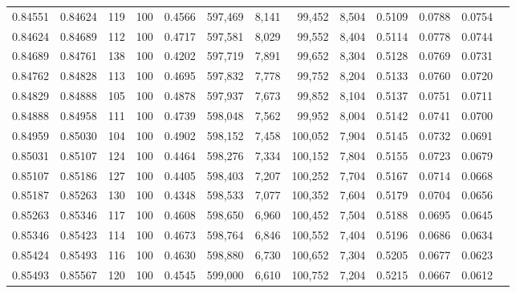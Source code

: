 \begin{tabular}{rrrrrrrrrrrrr}
0.84551 & 0.84624 &   119 & 100 &                                     0.4566 & 597,469 &   8,141 &  99,452 &   8,504 & 0.5109 & 0.0788 & 0.0754 \\
0.84624 & 0.84689 &   112 & 100 &                                     0.4717 & 597,581 &   8,029 &  99,552 &   8,404 & 0.5114 & 0.0778 & 0.0744 \\
0.84689 & 0.84761 &   138 & 100 &                                     0.4202 & 597,719 &   7,891 &  99,652 &   8,304 & 0.5128 & 0.0769 & 0.0731 \\
0.84762 & 0.84828 &   113 & 100 &                                     0.4695 & 597,832 &   7,778 &  99,752 &   8,204 & 0.5133 & 0.0760 & 0.0720 \\
0.84829 & 0.84888 &   105 & 100 &                                     0.4878 & 597,937 &   7,673 &  99,852 &   8,104 & 0.5137 & 0.0751 & 0.0711 \\
0.84888 & 0.84958 &   111 & 100 &                                     0.4739 & 598,048 &   7,562 &  99,952 &   8,004 & 0.5142 & 0.0741 & 0.0700 \\
0.84959 & 0.85030 &   104 & 100 &                                     0.4902 & 598,152 &   7,458 & 100,052 &   7,904 & 0.5145 & 0.0732 & 0.0691 \\
0.85031 & 0.85107 &   124 & 100 &                                     0.4464 & 598,276 &   7,334 & 100,152 &   7,804 & 0.5155 & 0.0723 & 0.0679 \\
0.85107 & 0.85186 &   127 & 100 &                                     0.4405 & 598,403 &   7,207 & 100,252 &   7,704 & 0.5167 & 0.0714 & 0.0668 \\
0.85187 & 0.85263 &   130 & 100 &                                     0.4348 & 598,533 &   7,077 & 100,352 &   7,604 & 0.5179 & 0.0704 & 0.0656 \\
0.85263 & 0.85346 &   117 & 100 &                                     0.4608 & 598,650 &   6,960 & 100,452 &   7,504 & 0.5188 & 0.0695 & 0.0645 \\
0.85346 & 0.85423 &   114 & 100 &                                     0.4673 & 598,764 &   6,846 & 100,552 &   7,404 & 0.5196 & 0.0686 & 0.0634 \\
0.85424 & 0.85493 &   116 & 100 &                                     0.4630 & 598,880 &   6,730 & 100,652 &   7,304 & 0.5205 & 0.0677 & 0.0623 \\
0.85493 & 0.85567 &   120 & 100 &                                     0.4545 & 599,000 &   6,610 & 100,752 &   7,204 & 0.5215 & 0.0667 & 0.0612 \\

\end{tabular}
